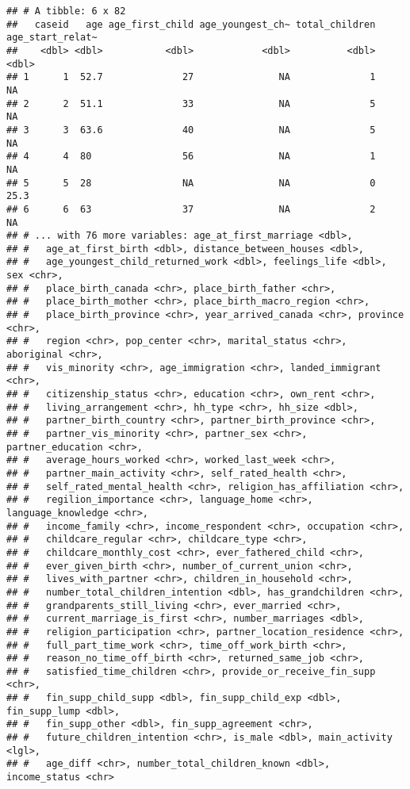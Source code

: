 \documentclass[
]{article}
\begin{document}
\begin{verbatim}
## # A tibble: 6 x 82
##   caseid   age age_first_child age_youngest_ch~ total_children age_start_relat~
##    <dbl> <dbl>           <dbl>            <dbl>          <dbl>            <dbl>
## 1      1  52.7              27               NA              1             NA  
## 2      2  51.1              33               NA              5             NA  
## 3      3  63.6              40               NA              5             NA  
## 4      4  80                56               NA              1             NA  
## 5      5  28                NA               NA              0             25.3
## 6      6  63                37               NA              2             NA  
## # ... with 76 more variables: age_at_first_marriage <dbl>,
## #   age_at_first_birth <dbl>, distance_between_houses <dbl>,
## #   age_youngest_child_returned_work <dbl>, feelings_life <dbl>, sex <chr>,
## #   place_birth_canada <chr>, place_birth_father <chr>,
## #   place_birth_mother <chr>, place_birth_macro_region <chr>,
## #   place_birth_province <chr>, year_arrived_canada <chr>, province <chr>,
## #   region <chr>, pop_center <chr>, marital_status <chr>, aboriginal <chr>,
## #   vis_minority <chr>, age_immigration <chr>, landed_immigrant <chr>,
## #   citizenship_status <chr>, education <chr>, own_rent <chr>,
## #   living_arrangement <chr>, hh_type <chr>, hh_size <dbl>,
## #   partner_birth_country <chr>, partner_birth_province <chr>,
## #   partner_vis_minority <chr>, partner_sex <chr>, partner_education <chr>,
## #   average_hours_worked <chr>, worked_last_week <chr>,
## #   partner_main_activity <chr>, self_rated_health <chr>,
## #   self_rated_mental_health <chr>, religion_has_affiliation <chr>,
## #   regilion_importance <chr>, language_home <chr>, language_knowledge <chr>,
## #   income_family <chr>, income_respondent <chr>, occupation <chr>,
## #   childcare_regular <chr>, childcare_type <chr>,
## #   childcare_monthly_cost <chr>, ever_fathered_child <chr>,
## #   ever_given_birth <chr>, number_of_current_union <chr>,
## #   lives_with_partner <chr>, children_in_household <chr>,
## #   number_total_children_intention <dbl>, has_grandchildren <chr>,
## #   grandparents_still_living <chr>, ever_married <chr>,
## #   current_marriage_is_first <chr>, number_marriages <dbl>,
## #   religion_participation <chr>, partner_location_residence <chr>,
## #   full_part_time_work <chr>, time_off_work_birth <chr>,
## #   reason_no_time_off_birth <chr>, returned_same_job <chr>,
## #   satisfied_time_children <chr>, provide_or_receive_fin_supp <chr>,
## #   fin_supp_child_supp <dbl>, fin_supp_child_exp <dbl>, fin_supp_lump <dbl>,
## #   fin_supp_other <dbl>, fin_supp_agreement <chr>,
## #   future_children_intention <chr>, is_male <dbl>, main_activity <lgl>,
## #   age_diff <chr>, number_total_children_known <dbl>, income_status <chr>
\end{verbatim}
\end{document}
